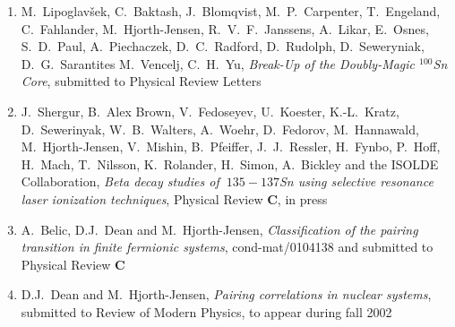 \begin{enumerate}
\item 
M.~Lipoglav\v{s}ek, C.~Baktash, J.~Blomqvist,
M.~P.~Carpenter, T.~Engeland, C.~Fahlander,
M.~Hjorth-Jensen, R.~V.~F.~Janssens, A.~Likar,
E.~Osnes, S.~D.~Paul, A.~Piechaczek, D.~C.~Radford,
D.~Rudolph, D.~Seweryniak, D.~G.~Sarantites M.~Vencelj, C.~H.~Yu,
{\em Break-Up of the Doubly-Magic $^{100}$Sn Core}, 
submitted to Physical Review Letters


\item J.\ Shergur, B.~Alex Brown, V.\ Fedoseyev, U.\ Koester, K.-L.\ Kratz, 
D.\ Sewerinyak, W.\ B.\ Walters, A.\ Woehr, D.\ Fedorov, M.\ Hannawald, M.~Hjorth-Jensen,  V.\ Mishin, B.\ Pfeiffer, J.\ J.\ Ressler, H.\ Fynbo, P.\ Hoff, H.\ Mach, T.\ Nilsson, K.\ Rolander, H.\ Simon, A.\ Bickley and the ISOLDE Collaboration, 
{\em Beta decay studies of $~{135-137}$Sn  using selective resonance laser ionization techniques},
Physical Review {\bf C}, in press


\item A.~Belic, D.J.~Dean and M.~Hjorth-Jensen, {\em Classification
of the pairing transition in finite fermionic systems}, cond-mat/0104138
and submitted to Physical Review {\bf C}

\item D.J.~Dean and M.~Hjorth-Jensen, {\em Pairing correlations in
      nuclear systems}, submitted to  Review of Modern
      Physics, to appear during fall 2002

\end{enumerate}
